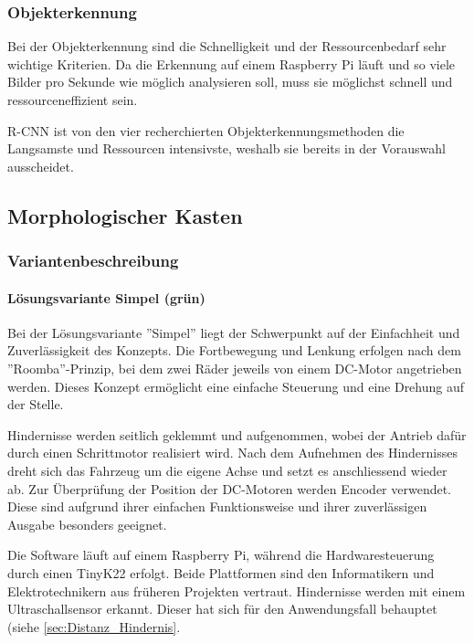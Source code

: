 \documentclass[../main.tex]{subfiles}
\begin{document}
\subsubsection{Objekterkennung}

Bei der Objekterkennung sind die Schnelligkeit und der Ressourcenbedarf sehr wichtige Kriterien.
Da die Erkennung auf einem Raspberry Pi läuft und so viele Bilder pro Sekunde wie möglich analysieren soll, muss sie möglichst schnell und ressourceneffizient sein. 

R-CNN ist von den vier recherchierten Objekterkennungsmethoden die Langsamste und Ressourcen intensivste, weshalb sie bereits in der Vorauswahl ausscheidet.


\subsection{Morphologischer Kasten}



    \subsubsection{Variantenbeschreibung}
    \paragraph{Lösungsvariante Simpel (grün)} 
    \label{a3:loesungsvariante_Simpel}
    Bei der Lösungsvariante ''Simpel'' liegt der Schwerpunkt auf der Einfachheit und Zuverlässigkeit des Konzepts. Die Fortbewegung und Lenkung erfolgen nach dem ''Roomba''-Prinzip, bei dem zwei Räder jeweils von einem DC-Motor angetrieben werden. Dieses Konzept ermöglicht eine einfache Steuerung und eine Drehung auf der Stelle.

    Hindernisse werden seitlich geklemmt und aufgenommen, wobei der Antrieb dafür durch einen Schrittmotor realisiert wird. Nach dem Aufnehmen des Hindernisses dreht sich das Fahrzeug um die eigene Achse und setzt es anschliessend wieder ab. Zur Überprüfung der Position der DC-Motoren werden Encoder verwendet. Diese sind aufgrund ihrer einfachen Funktionsweise und ihrer zuverlässigen Ausgabe besonders geeignet.

    Die Software läuft auf einem Raspberry Pi, während die Hardwaresteuerung durch einen TinyK22 erfolgt. Beide Plattformen sind den Informatikern und Elektrotechnikern aus früheren Projekten vertraut. Hindernisse werden mit einem Ultraschallsensor erkannt. Dieser hat sich für den Anwendungsfall behauptet (siehe \ref{sec:Distanz_Hindernis}. 
\end{document}
